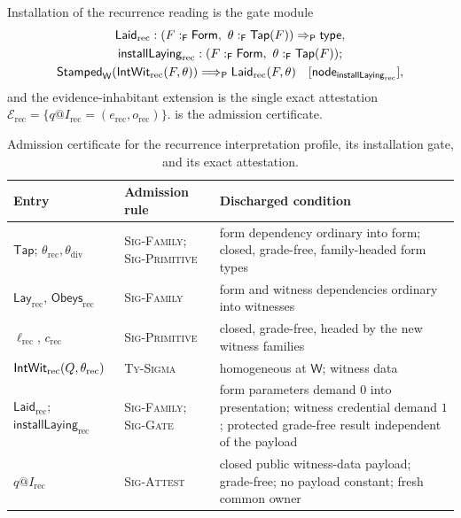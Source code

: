 \documentclass[11pt]{article}
\numberwithin{equation}{section}
\theoremstyle{definition}
\theoremstyle{plain}
\theoremstyle{remark}
\newcommand{\Type}{\mathsf{type}}
\renewcommand{\Form}{\AFForm}
\newcommand{\Stamped}{\mathsf{Stamped}}
\newcommand{\Frm}{\mathsf F}
\newcommand{\Prs}{\mathsf P}
\newcommand{\Wit}{\mathsf W}
\begin{document}
Installation of the recurrence reading is the gate module
\[
\begin{gathered}
 \mathsf{Laid}_{\mathrm{rec}}:
  (F:_{\Frm}\Form,\ \theta:_{\Frm}\mathsf{Tap}(F))\Rightarrow_{\Prs}\Type,\\
 \mathsf{installLaying}_{\mathrm{rec}}:
 (F:_{\Frm}\Form,\ \theta:_{\Frm}\mathsf{Tap}(F));\\
 \Stamped_\Wit(\AFIntWit_{\mathrm{rec}}(F,\theta))
 \Longrightarrow_{\Prs}\mathsf{Laid}_{\mathrm{rec}}(F,\theta)
 \quad[\mathsf{node}_{\mathsf{installLaying}_{\mathrm{rec}}}],
\end{gathered}
\]
and the evidence-inhabitant extension is the single exact attestation
\(\mathcal E_{\mathrm{rec}}=\{q@I_{\mathrm{rec}}=(e_{\mathrm{rec}},o_{\mathrm{rec}})\}\).
 is the admission certificate.

\begin{table}[ht]
\centering
\small
\begin{tabularx}{\textwidth}{@{}l>{\raggedright\arraybackslash}p{}X@{}}
\toprule
Entry & Admission rule & Discharged condition\\
\midrule
\(\mathsf{Tap}\); \(\theta_{\mathrm{rec}},\theta_{\mathrm{div}}\) &
\textsc{Sig-Family}; \textsc{Sig-Primitive} & form dependency ordinary
into form; closed, grade-free, family-headed form types\\
\(\mathsf{Lay}_{\mathrm{rec}}\), \(\mathsf{Obeys}_{\mathrm{rec}}\) &
\textsc{Sig-Family} & form and witness dependencies ordinary into
witnesses\\
\(\ell_{\mathrm{rec}}\), \(c_{\mathrm{rec}}\) & \textsc{Sig-Primitive} &
closed, grade-free, headed by the new witness families\\
\({\mathsf{IntWit}}_{\mathrm{rec}}(Q,\theta_{\mathrm{rec}})\) &
\textsc{Ty-Sigma} & homogeneous at \(\Wit\); witness data\\
\(\mathsf{Laid}_{\mathrm{rec}}\); \(\mathsf{installLaying}_{\mathrm{rec}}\) &
\textsc{Sig-Family}; \textsc{Sig-Gate} & form parameters demand \(0\)
into presentation; witness credential demand \(1\); protected grade-free result
independent of the payload\\
\(q@I_{\mathrm{rec}}\) & \textsc{Sig-Attest} & closed public witness-data
payload; grade-free; no payload constant; fresh common owner\\
\bottomrule
\end{tabularx}
\caption{Admission certificate for the recurrence interpretation profile,
its installation gate, and its exact attestation.}
\label{tab:interpretation-certificate}
\end{table}
\end{document}
